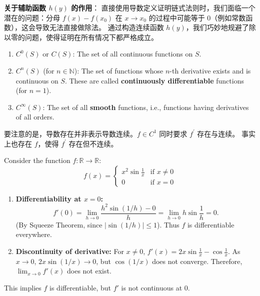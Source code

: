 \documentclass[
	UTF-8,
	11pt, %
	a4paper, %
]{LegrandOrangeBook}
\begin{document}
    \begin{remark}
    \textbf{关于辅助函数 $h(y)$ 的作用}：
    直接使用导数定义证明链式法则时，我们面临一个潜在的问题：分母 $f(x) - f(x_0)$ 在 $x \to x_0$ 的过程中可能等于 0（例如常数函数），这会导致无法直接做除法。
    通过构造连续函数 $h(y)$，我们巧妙地规避了除以零的问题，使得证明在所有情况下都严格成立。
    \end{remark}

    \newpage

    \begin{definition}
    \begin{enumerate}
        \item $C^0(S)$ or $C(S)$: The set of all continuous functions on $S$.

        \item $C^n(S)$ (for $n \in \mathbb{N}$): The set of functions whose $n$-th derivative exists and is continuous on $S$. These are called \textbf{continuously differentiable} functions (for $n=1$).
        
        \item $C^\infty(S)$: The set of all \textbf{smooth} functions, i.e., functions having derivatives of all orders.
    \end{enumerate}
    \end{definition}

    \begin{remark}
        要注意的是，导数存在并非表示导数连续。$f \in C^{1}$ 同时要求 $f^{\prime}$ 存在与连续。
        事实上也存在 $f$，使得 $f^{\prime}$ 存在但不连续。
    \end{remark}

    
    \begin{example}
    Consider the function $f: \mathbb{R} \to \mathbb{R}$:
    \[
    f(x) = \begin{cases} 
    x^2 \sin \frac{1}{x} & \text{if } x \neq 0 \\
    0 & \text{if } x = 0 
    \end{cases}
    \]
    \begin{enumerate}
        \item \textbf{Differentiability at $x=0$:}
        \[ f'(0) = \lim_{h \to 0} \frac{h^2 \sin(1/h) - 0}{h} = \lim_{h \to 0} h \sin \frac{1}{h} = 0. \]
        (By Squeeze Theorem, since $|\sin(1/h)| \le 1$). Thus $f$ is differentiable everywhere.
        
        \item \textbf{Discontinuity of derivative:}
        For $x \neq 0$, $f'(x) = 2x \sin \frac{1}{x} - \cos \frac{1}{x}$.
        As $x \to 0$, $2x \sin(1/x) \to 0$, but $\cos(1/x)$ does not converge.
        Therefore, $\lim_{x \to 0} f'(x)$ does not exist.
    \end{enumerate}
    This implies $f$ is differentiable, but $f'$ is not continuous at 0.
    \end{example}
\end{document}
